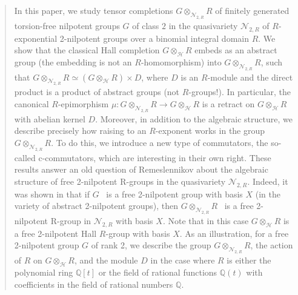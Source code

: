 \documentclass[11pt]{article}
\def\N{{\mathbb N}}
\def\N{{\mathcal{N}}}
\theoremstyle{definition}
\begin{document}
\begin{abstract}
In this paper, we study tensor completions $G \otimes_{\N_{2,R}} R$ of finitely generated torsion-free nilpotent groups $G$ of class $2$ in the quasivariety $\N_{2,R}$ of $R$-exponential 2-nilpotent groups over a binomial integral domain $R$. We show that the classical Hall completion $G\otimes_{\mathcal{H}} R$ embeds as an abstract group (the embedding is not an $R$-homomorphism) into $G \otimes_{\N_{2,R}} R$, such that $G\otimes_{\N_{2,R}} R \simeq (G \otimes_{\mathcal{H}} R) \times D$, where $D$ is an $R$-module and the direct product is a product of abstract groups (not $R$-groups!). In particular, the canonical $R$-epimorphism $\mu: G \otimes_{\N_{2,R}} R \to G \otimes_{\mathcal{H}} R$ is a retract on $G \otimes_{\mathcal{H}} R$ with abelian kernel $D$. Moreover, in addition to the algebraic structure, we describe precisely how raising to an $R$-exponent works in the group $G \otimes_{\N_{2,R}} R$. To do this, we introduce a new type of commutators, the so-called c-commutators, which are interesting in their own right. These results answer an old question of Remeslennikov about the algebraic structure of free 2-nilpotent R-groups in the quasivariety $\N_{2,R}$. Indeed, it was shown in \cite{AMN} that if $G$~ is a free 2-nilpotent group with basis $X$ (in the variety of abstract 2-nilpotent groups), then $G \otimes_{\N_{2,R}} R$~ is a free 2-nilpotent R-group in $\N_{2,R}$ with basis $X$. Note that in this case $G \otimes_{\mathcal{H}} R$ is a free 2-nilpotent Hall $R$-group with basis $X$. As an illustration, for a free 2-nilpotent group $G$ of rank 2, we describe the group $G \otimes_{\N_{2,R}} R$, the action of $R$ on $G \otimes_{\mathcal{H}} R$, and the module $D$ in the case where $R$ is either the polynomial ring $\mathbb{Q}[t]$ or the field of rational functions $\mathbb{Q}(t)$ with coefficients in the field of rational numbers $\mathbb{Q}$.
\end{abstract}

\end{document}
